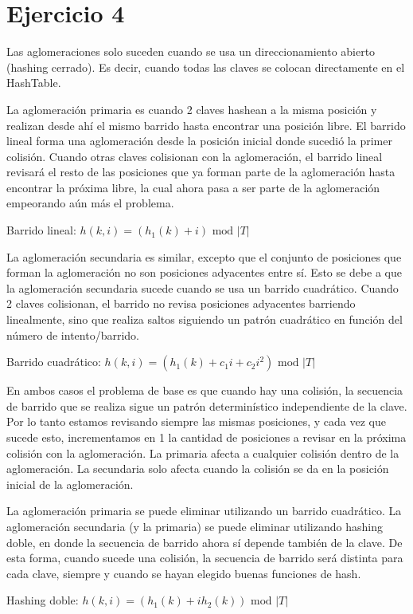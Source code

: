 \section*{Ejercicio 4}

Las aglomeraciones solo suceden cuando se usa un direccionamiento abierto (hashing cerrado). Es decir, cuando todas las claves se colocan directamente en el HashTable.

La aglomeración primaria es cuando 2 claves hashean a la misma posición y realizan desde ahí el mismo barrido hasta encontrar una posición libre. El barrido lineal forma una aglomeración desde la posición inicial donde sucedió la primer colisión. Cuando otras claves colisionan con la aglomeración, el barrido lineal revisará el resto de las posiciones que ya forman parte de la aglomeración hasta encontrar la próxima libre, la cual ahora pasa a ser parte de la aglomeración empeorando aún más el problema.

Barrido lineal: $h(k, i) = (h_1(k) + i) \text{ mod } |T|$

La aglomeración secundaria es similar, excepto que el conjunto de posiciones que forman la aglomeración no son posiciones adyacentes entre sí. Esto se debe a que la aglomeración secundaria sucede cuando se usa un barrido cuadrático. Cuando 2 claves colisionan, el barrido no revisa posiciones adyacentes barriendo linealmente, sino que realiza saltos siguiendo un patrón cuadrático en función del número de intento/barrido.

Barrido cuadrático: $h(k, i) = (h_1(k) + c_1 i + c_2 i^2) \text{ mod } |T|$

En ambos casos el problema de base es que cuando hay una colisión, la secuencia de barrido que se realiza sigue un patrón determinístico independiente de la clave. Por lo tanto estamos revisando siempre las mismas posiciones, y cada vez que sucede esto, incrementamos en 1 la cantidad de posiciones a revisar en la próxima colisión con la aglomeración. La primaria afecta a cualquier colisión dentro de la aglomeración. La secundaria solo afecta cuando la colisión se da en la posición inicial de la aglomeración.

La aglomeración primaria se puede eliminar utilizando un barrido cuadrático. La aglomeración secundaria (y la primaria) se puede eliminar utilizando hashing doble, en donde la secuencia de barrido ahora sí depende también de la clave. De esta forma, cuando sucede una colisión, la secuencia de barrido será distinta para cada clave, siempre y cuando se hayan elegido buenas funciones de hash.

Hashing doble: $h(k, i) = (h_1(k) + i h_2(k)) \text{ mod } |T|$
